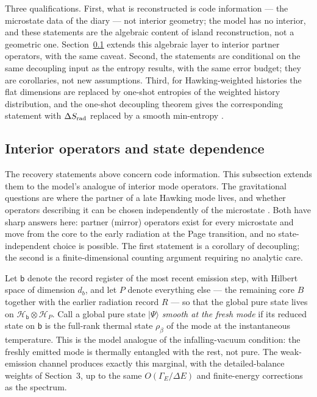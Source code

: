 \documentclass[12pt]{article}
\newcommand{\ket}[1]{|#1\rangle}
\begin{document}
Three qualifications.  First, what is reconstructed is code information ---
the microstate data of the diary --- not interior geometry; the model has no
interior, and these statements are the algebraic content of island
reconstruction, not a geometric one.  Section~\ref{sec:mirrors} extends this
algebraic layer to interior partner operators, with the same caveat.  Second,
the statements are conditional
on the same decoupling input as the entropy results, with the same error
budget; they are corollaries, not new assumptions.  Third, for
Hawking-weighted histories the flat dimensions are replaced by one-shot
entropies of the weighted history distribution, and the one-shot decoupling
theorem gives the corresponding statement with $\Delta S_{\rm rad}$ replaced
by a smooth min-entropy \cite{Dupuis2014}.

\subsection{Interior operators and state dependence}
\label{sec:mirrors}

The recovery statements above concern code information.  This subsection
extends them to the model's analogue of interior mode operators.  The
gravitational questions are where the partner of a late Hawking mode lives,
and whether operators describing it can be chosen independently of the
microstate \cite{AMPS2013,PapadodimasRaju2013,PapadodimasRaju2014,
VerlindeVerlinde2013,Harlow2016}.  Both have sharp answers here: partner
(mirror) operators exist for every microstate and move from the core to the
early radiation at the Page transition, and no state-independent choice is
possible.  The first statement is a corollary of decoupling; the second is a
finite-dimensional counting argument requiring no analytic care.

Let $\mathsf b$ denote the record register of the most recent emission step,
with Hilbert space of dimension $d_b$, and let $P$ denote everything else ---
the remaining core $B$ together with the earlier radiation record $R$ --- so
that the global pure state lives on
$\mathcal H_{\mathsf b}\otimes\mathcal H_P$.  Call a global pure state
$\ket\Psi$ \emph{smooth at the fresh mode} if its reduced state on
$\mathsf b$ is the full-rank thermal state $\rho_\beta$ of the mode at the
instantaneous temperature.  This is the model analogue of the
infalling-vacuum condition: the freshly emitted mode is thermally entangled
with the rest, not pure.  The weak-emission channel produces exactly this
marginal, with the detailed-balance weights of Section~3, up to the same
$O(\Gamma_E/\Delta E)$ and finite-energy corrections as the spectrum.
\end{document}
